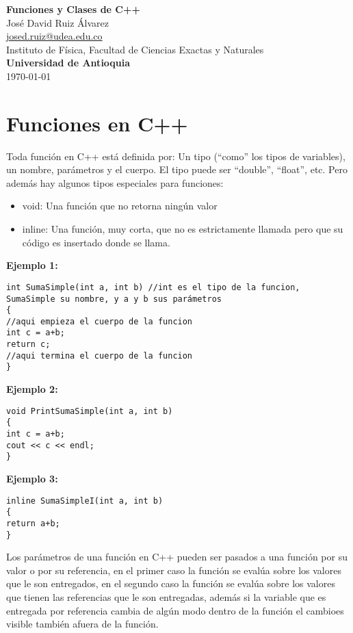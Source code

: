 \documentclass[10.5pt]{article}
\begin{document}
\noindent
\begin{minipage}[b]{0.75\linewidth}
{\LARGE\bf Funciones y Clases de C++}\\ %
\large{Jos\'{e} David Ruiz \'{A}lvarez} \\
\small{\href{mailto:josed.ruiz@udea.edu.co}{josed.ruiz@udea.edu.co}} \\ %
\normalsize{Instituto de Física, Facultad de Ciencias Exactas y Naturales} \\%
\normalsize{\bf Universidad de Antioquia} \\[8mm]
\today %
\end{minipage}%


\section{Funciones en C++}

Toda función en C++ está definida por: Un tipo (``como'' los tipos de variables), un nombre, parámetros y el cuerpo. El tipo puede ser ``double'', ``float'', etc. Pero además hay algunos tipos especiales para funciones:

\begin{itemize}
\item void: Una función que no retorna ningún valor
\item inline: Una función, muy corta, que no es estrictamente llamada pero que su código es insertado donde se llama.
\end{itemize}

{\bf Ejemplo 1:}
\begin{verbatim}
int SumaSimple(int a, int b) //int es el tipo de la funcion, SumaSimple su nombre, y a y b sus parámetros
{
//aqui empieza el cuerpo de la funcion
int c = a+b;
return c;
//aqui termina el cuerpo de la funcion
}
\end{verbatim}

{\bf Ejemplo 2:}
\begin{verbatim}
void PrintSumaSimple(int a, int b) 
{
int c = a+b;
cout << c << endl;
}
\end{verbatim}

{\bf Ejemplo 3:}
\begin{verbatim}
inline SumaSimpleI(int a, int b) 
{
return a+b;
}
\end{verbatim}

Los parámetros de una función en C++ pueden ser pasados a una función por su valor o por su referencia, en el primer caso la función se evalúa sobre los valores que le son entregados, en el segundo caso la función se evalúa sobre los valores que tienen las referencias que le son entregadas, además si la variable que es entregada por referencia cambia de algún modo dentro de la función el cambioes visible también afuera de la función.
\end{document}
